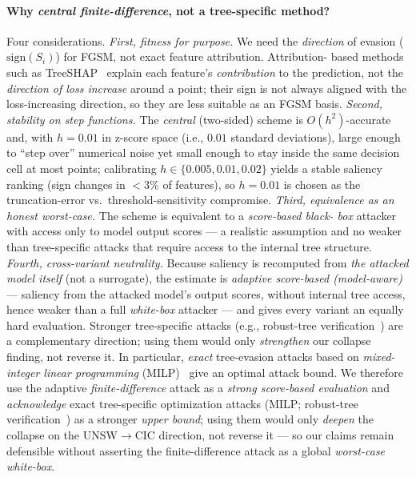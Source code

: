 \documentclass[preprint,12pt,authoryear]{elsarticle}
\begin{document}
\paragraph{Why \emph{central finite-difference}, not a tree-specific method?} Four
considerations. \emph{First, fitness for purpose.} We need the \emph{direction} of
evasion ($\mathrm{sign}(S_i)$) for FGSM, not exact feature attribution. Attribution-
based methods such as TreeSHAP~\citep{lundberg2020treeshap} explain each feature's
\emph{contribution} to the prediction, not the \emph{direction of loss increase}
around a point; their sign is not always aligned with the loss-increasing direction,
so they are less suitable as an FGSM basis. \emph{Second, stability on step
functions.} The \emph{central} (two-sided) scheme is $O(h^2)$-accurate and, with
$h=0.01$ in z-score space (i.e., $0.01$ standard deviations), large enough to ``step
over'' numerical noise yet small enough to stay inside the same decision cell at
most points; calibrating $h \in \{0.005, 0.01, 0.02\}$ yields a stable saliency
ranking (sign changes in $<3\%$ of features), so $h=0.01$ is chosen as the
truncation-error vs.\ threshold-sensitivity compromise. \emph{Third, equivalence as
an honest \emph{worst-case}.} The scheme is equivalent to a \emph{score-based black-
box} attacker~\citep{ilyas2018blackbox} with access only to model output scores --- a
realistic assumption and no weaker than tree-specific attacks that require access to
the internal tree structure. \emph{Fourth, cross-variant neutrality.} Because
saliency is recomputed from \emph{the attacked model itself} (not a surrogate), the
estimate is \emph{adaptive score-based (model-aware)} --- saliency from the attacked model's output scores, without internal tree access, hence weaker than a full \emph{white-box} attacker --- and gives every variant an equally hard
evaluation. Stronger tree-specific attacks (e.g., robust-tree
verification~\citep{chen2019robusttrees}) are a complementary direction; using them
would only \emph{strengthen} our collapse finding, not reverse it. In particular, \emph{exact} tree-evasion attacks based on \emph{mixed-integer linear programming} (MILP)~\citep{kantchelian2016} give an optimal attack bound. We therefore use the adaptive \emph{finite-difference} attack as a \emph{strong score-based evaluation} and \emph{acknowledge} exact tree-specific optimization attacks (MILP; robust-tree verification~\citep{chen2019robusttrees}) as a stronger \emph{upper bound}; using them would only \emph{deepen} the collapse on the UNSW$\rightarrow$CIC direction, not reverse it --- so our claims remain defensible without asserting the finite-difference attack as a global \emph{worst-case white-box}.
\end{document}
